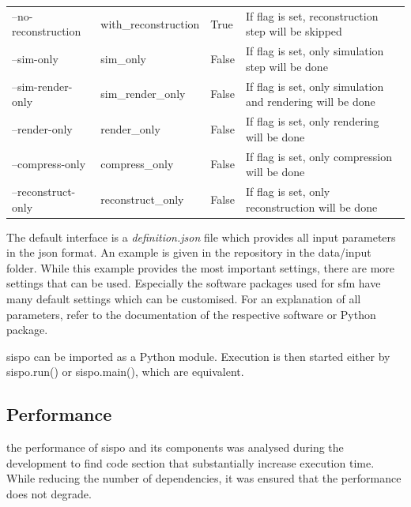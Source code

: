 \begin{table}[htb]
\begin{tabular}{p{}|p{}|p{}|p{}}
        \multicolumn{1}{l|}{--no-reconstruction} & with\_reconstruction   & True                       & If flag is set,        reconstruction step will be skipped                                                                       \\
        \multicolumn{1}{l|}{--sim-only}          & sim\_only              & False                      & If flag is set,        only simulation step will be done                                                                         \\
        \multicolumn{1}{l|}{--sim-render-only}   & sim\_render\_only      & False                      & If flag is set,        only simulation and rendering will be done                                                                \\
        \multicolumn{1}{l|}{--render-only}       & render\_only           & False                      & If flag is set,        only rendering will be done                                                                               \\
        \multicolumn{1}{l|}{--compress-only}     & compress\_only         & False                      & If flag is set,        only compression will be done                                                                             \\
        \multicolumn{1}{l|}{--reconstruct-only}  & reconstruct\_only      & False                      & If flag is set, only reconstruction will be done       
    \end{tabular}
\end{table}

The default interface is a \textit{definition.json} file which provides all input parameters in the \gls{json} format. An example is given in the repository in the data/input folder. While this example provides the most important settings, there are more settings that can be used. Especially the software packages used for \gls{sfm} have many default settings which can be customised. For an explanation of all parameters, refer to the documentation of the respective software or Python package.

\gls{sispo} can be imported as a Python module. Execution is then started either by sispo.run() or sispo.main(), which are equivalent.

\subsection{Performance}
the performance of \gls{sispo} and its components was analysed during the development to find code section that substantially increase execution time. While reducing the number of dependencies, it was ensured that the performance does not degrade.

